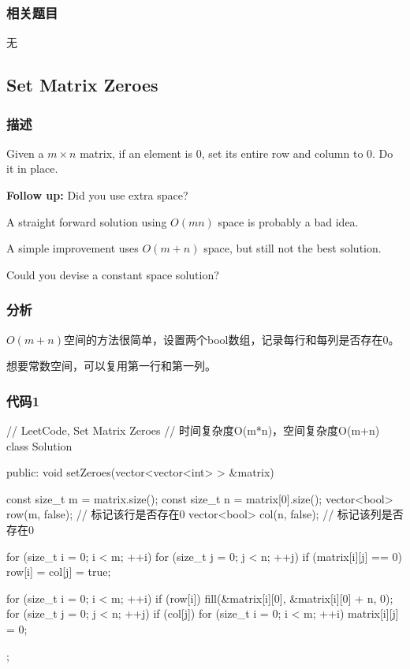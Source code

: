 \subsubsection{相关题目}
\begindot
\item 无
\myenddot


\subsection{Set Matrix Zeroes} %
\label{sec:set-matrix-zeroes}


\subsubsection{描述}
Given a $m \times n$ matrix, if an element is 0, set its entire row and column to 0. Do it in place.

\textbf{Follow up:}
Did you use extra space?

A straight forward solution using $O(mn)$ space is probably a bad idea.

A simple improvement uses $O(m + n)$ space, but still not the best solution.

Could you devise a constant space solution?


\subsubsection{分析}
$O(m+n)$空间的方法很简单，设置两个bool数组，记录每行和每列是否存在0。

想要常数空间，可以复用第一行和第一列。


\subsubsection{代码1}
\begin{Code}
// LeetCode, Set Matrix Zeroes
// 时间复杂度O(m*n)，空间复杂度O(m+n)
class Solution {
public:
    void setZeroes(vector<vector<int> > &matrix) {
        const size_t m = matrix.size();
        const size_t n = matrix[0].size();
        vector<bool> row(m, false); // 标记该行是否存在0
        vector<bool> col(n, false); // 标记该列是否存在0

        for (size_t i = 0; i < m; ++i) {
            for (size_t j = 0; j < n; ++j) {
                if (matrix[i][j] == 0) {
                    row[i] = col[j] = true;
                }
            }
        }

        for (size_t i = 0; i < m; ++i) {
            if (row[i])
                fill(&matrix[i][0], &matrix[i][0] + n, 0);
        }
        for (size_t j = 0; j < n; ++j) {
            if (col[j]) {
                for (size_t i = 0; i < m; ++i) {
                    matrix[i][j] = 0;
                }
            }
        }
    }
};
\end{Code}


